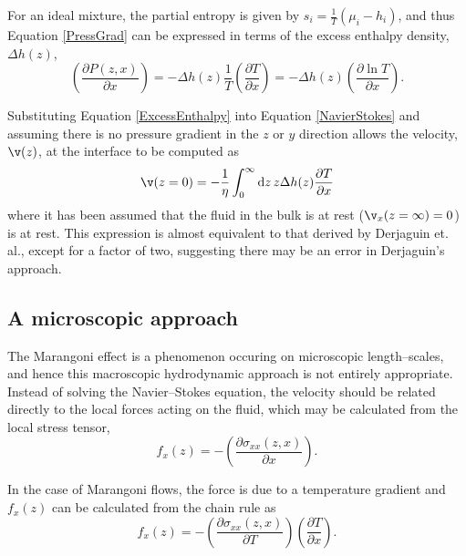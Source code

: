 For an ideal mixture, the partial entropy is given by $s_{i}=\frac{1}{T} \left(\mu_{i}-h_{i} \right)$, and thus Equation \ref{PressGrad} can be expressed in terms of the excess enthalpy density, $\Delta h(z)$,
\begin{equation}
\label{ExcessEnthalpy}
\left(\frac{\partial P(z,x)}{\partial x}\right)= - \Delta h(z)\frac{1}{T} \left( \frac{\partial T}{\partial x} \right) 
= - \Delta h(z) \left( \frac{\partial \ln T}{\partial x} \right).
\end{equation}

Substituting Equation \ref{ExcessEnthalpy} into Equation \ref{NavierStokes} and assuming there is no pressure gradient in the $z$ or $y$ direction allows the velocity, $\v(z)$, at the interface to be computed as
\begin{equation}
\label{DoubleIntegral}
\v (z=0) = - \frac{1}{\eta}\int_{0}^{\infty} \mathrm{d}z\, z \Delta h(z) \frac{\partial T}{\partial x}
\end{equation}
where it has been assumed that the fluid in the bulk is at rest ($\v_{x}(z=\infty)=0$) is at rest.
This expression is almost equivalent to that derived by Derjaguin et. al., except for a factor of two, suggesting there may be an error in Derjaguin's approach.\cite{SurfaceForces, Anderson}

\subsection{A microscopic approach}
The Marangoni effect is a phenomenon occuring on microscopic length--scales, and hence this macroscopic hydrodynamic approach is not entirely appropriate.
Instead of solving the Navier--Stokes equation, the velocity should be related directly to the local forces acting on the fluid, which may be calculated from the local stress tensor,
\begin{equation}
\label{ForceStress}
f_{x}(z) = - \left( \frac{\partial \sigma_{xx}(z,x)}{\partial x} \right).
\end{equation}

In the case of Marangoni flows, the force is due to a temperature gradient and $f_{x}(z)$ can be calculated from the chain rule as
\begin{equation}
\label{ForceStressTemp}
f_{x}(z) = - \left( \frac{\partial \sigma_{xx}(z,x)}{\partial T} \right) \left( \frac{\partial T}{\partial x} \right).
\end{equation}

